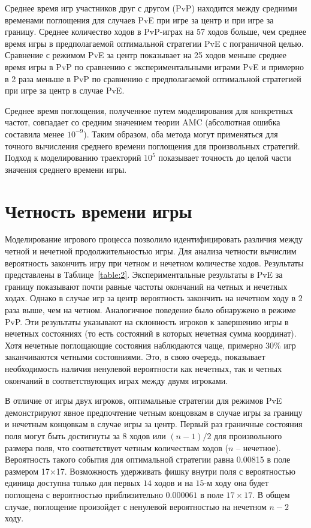 Среднее время игр участников друг с другом (PvP) находится между средними временами поглощения для случаев PvE при игре за центр и при игре за границу. 
Среднее количество ходов в PvP-играх на 57 ходов больше, 
чем среднее время игры в предполагаемой оптимальной стратегии PvE с пограничной целью. 
Сравнение с режимом PvE за центр показывает на 25 ходов меньше среднее время игры в PvP по сравнению 
с экспериментальными играми PvE и примерно в 2 раза меньше в PvP по сравнению с предполагаемой оптимальной стратегией при игре за центр в случае PvE.

Среднее время поглощения, полученное путем моделирования для конкретных частот, 
совпадает со средним значением теории AMC (абсолютная ошибка составила менее $10^{-9}$). 
Таким образом, оба метода могут применяться для точного вычисления среднего времени поглощения для произвольных стратегий. 
Подход к моделированию траекторий $10^5$ показывает точность до целой части значения среднего времени игры.

\section{Четность времени игры}\label{sec:ch3/sec2}

Моделирование игрового процесса позволило идентифицировать различия между четной и нечетной продолжительностью игры. 
Для анализа четности вычислим вероятность закончить игру при четном и нечетном количестве ходов.
Результаты представлены в Таблице~\ref{table:2}. Экспериментальные результаты в PvE за границу показывают почти равные частоты окончаний на четных и нечетных ходах. 
Однако в случае игр за центр вероятность закончить на нечетном ходу в $2$ раза выше, чем на четном. Аналогичное поведение было обнаружено в режиме PvP. 
Эти результаты указывают на склонность игроков к завершению игры в нечетных состояниях (то есть состояний в которых нечетная сумма координат). 
Хотя нечетные поглощающие состояния наблюдаются чаще, примерно $30\%$ игр заканчиваются четными состояниями. 
Это, в свою очередь, показывает необходимость наличия ненулевой вероятности как нечетных, так и четных окончаний в соответствующих играх между двумя игроками.

В отличие от игры двух игроков, оптимальные стратегии для режимов PvE демонстрируют явное предпочтение четным концовкам в случае игры за границу и 
нечетным концовкам в случае игры за центр. Первый раз граничные состояния поля могут быть достигнуты за $8$ ходов или $(n-1)/2$ для произвольного размера поля, 
что соответствует четным количествам ходов ($n$ – нечетное). Вероятность такого события для оптимальной стратегии равна 0.00815 в поле размером 17×17. 
Возможность удерживать фишку внутри поля с вероятностью единица доступна только для первых $14$ ходов и на $15$-м ходу она будет поглощена с вероятностью 
приблизительно $0.000061$ в поле $17 \times 17$. В общем случае, поглощение произойдет с ненулевой вероятностью на нечетном $n-2$ ходу.

